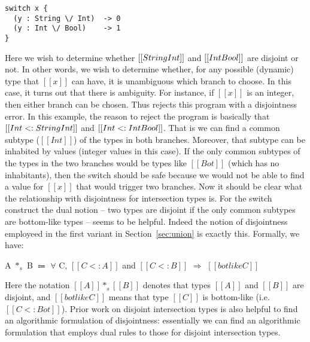 \begin{lstlisting}
switch x {
  (y : String \/ Int)  -> 0
  (y : Int \/ Bool)    -> 1
}
\end{lstlisting}

\noindent Here we wish to determine whether $[[String \/ Int]]$ and $[[Int \/ Bool]]$
are disjoint or not. In other words, we wish to determine whether, for any possible
(dynamic) type that $[[x]]$ can have, it is unambiguous which branch to choose.
In this case, it turns out that there is ambiguity. For instance, if $[[x]]$ is an integer,
then either branch can be chosen. Thus \cal rejects this program with a disjointness error.
In this example, the reason to reject the program is basically that $[[Int <: String \/ Int]]$
and $[[Int <: Int \/ Bool]]$. That is we can find a common subtype ($[[Int]]$) of the
types in both branches. Moreover, that subtype can be inhabited by values (integer values
in this case). If the only common subtypes of the types in the two branches
would be types like $[[Bot]]$ (which has no inhabitants), then the switch should
be safe because we would not be able to find a value for $[[x]]$ that would trigger
two branches. Now it should be clear what the relationship with disjointness for intersection
types is. For the switch construct the dual notion -- two types are disjoint if the only
common subtypes are bottom-like types -- seems to be helpful.
Indeed the notion of disjointness employeed in the first variant \cal in Section~\ref{sec:union}
is exactly this. Formally, we have:

\begin{definition}\label{def:disjointness}
	A $*_s$ B $\Coloneqq$ $\forall$ C, $[[C <: A]]$ and $[[C <: B]]$ $\Longrightarrow$ $[[botlike C]]$
\end{definition}

\noindent Here the notation $[[A]] *_s [[B]]$ denotes that types $[[A]]$ and $[[B]]$ are disjoint,
and $[[botlike C]]$ means that type $[[C]]$ is bottom-like (i.e. $[[C <: Bot]]$).
Prior work on disjoint intersection types is also helpful
to find an algorithmic formulation of disjointness: essentially we can find an algorithmic
formulation that employs dual rules to those for disjoint intersection types.

